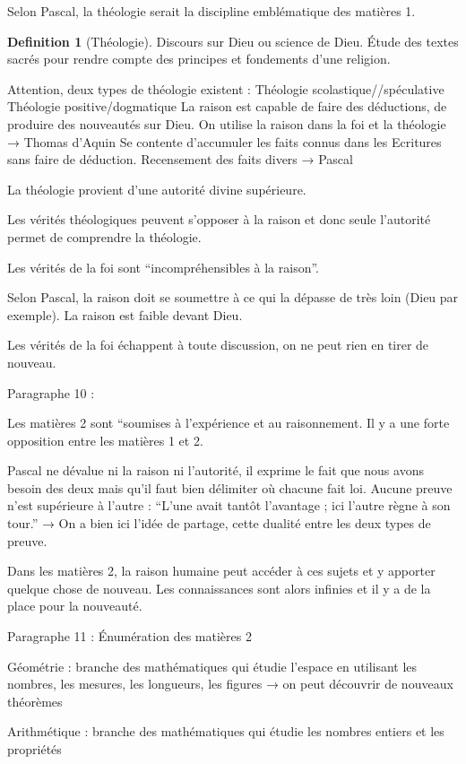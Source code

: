\documentclass[french]{book}
\theoremstyle{definition}
\newtheorem*{dfn}{Definition}
\begin{document}
Selon Pascal, la théologie serait la discipline emblématique des matières 1.

\begin{dfn}[Théologie]
Discours sur Dieu ou science de Dieu. Étude des textes sacrés pour rendre compte des principes et fondements d'une religion.
\end{dfn}


Attention, deux types de théologie existent :
Théologie scolastique//spéculative
Théologie positive/dogmatique
La raison est capable de faire des déductions, de produire des nouveautés sur Dieu. On utilise la raison dans la foi et la théologie → Thomas d’Aquin
Se contente d’accumuler les faits connus dans les Ecritures sans faire de déduction. Recensement des faits divers → Pascal


La théologie provient d’une autorité divine supérieure.

Les vérités théologiques peuvent s’opposer à la raison  et donc seule l'autorité permet de comprendre la théologie.

Les vérités de la foi sont “incompréhensibles à la raison”.

Selon Pascal, la raison doit se soumettre à ce qui la dépasse de très loin (Dieu par exemple). La raison est faible devant Dieu.

Les vérités de la foi échappent à toute discussion, on ne peut rien en tirer de nouveau.

Paragraphe 10 :

Les matières 2 sont “soumises à l’expérience et au raisonnement. Il y a une forte opposition entre les matières 1 et 2. 

Pascal ne dévalue ni la raison ni l’autorité, il exprime le fait que nous avons besoin des deux mais qu’il faut bien délimiter où chacune fait loi. Aucune preuve n'est supérieure à l’autre : “L’une avait tantôt l’avantage ; ici l’autre règne à son tour.” → On a bien ici l’idée de partage, cette dualité entre les deux types de preuve.

Dans les matières 2, la raison humaine peut accéder à ces sujets et y apporter quelque chose de nouveau. Les connaissances sont alors infinies et il y a de la place pour la nouveauté.

Paragraphe 11 : Énumération des matières 2 

Géométrie : branche des mathématiques qui étudie l’espace en utilisant les nombres, les mesures, les longueurs, les figures → on peut découvrir de nouveaux théorèmes

Arithmétique :  branche des mathématiques qui étudie les nombres entiers et les propriétés
\end{document}
